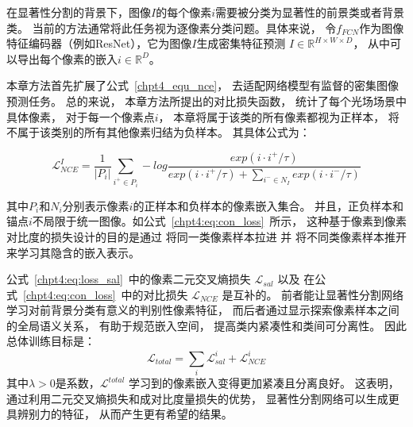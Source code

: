 % 

在显著性分割的背景下，图像$I$的每个像素$i$需要被分类为显著性的前景类或者背景类。
当前的方法通常将此任务视为逐像素分类问题。具体来说，
令$f_{FCN}$作为图像特征编码器（例如ResNet），它为图像$I$生成密集特征预测
$I\in \mathbb{R}^{ H \times W \times D}$，
从中可以导出每个像素的嵌入$i \in  \mathbb{R}^{D}$。



本章方法首先扩展了公式~\ref{chpt4_equ_nce}，
去适配网络模型有监督的密集图像预测任务。
总的来说，
本章方法所提出的对比损失函数，
统计了每个光场场景中具体像素，
对于每一个像素点$i$，
本章将属于该类的所有像素都视为正样本，
将不属于该类别的所有其他像素归结为负样本。
其具体公式为：



\begin{equation}
	\mathcal{L} _{NCE}^{I}= 
	\frac{1}{|P_{i}|}
	\sum_{i^{+}\in P_{i}}^{}  
	-log \frac
	{exp(i \cdot i^{+ }/\tau )}
	{exp(i \cdot i^{+}/\tau )+ \sum_{i^{-}\in N_{I}} exp(i \cdot i^{-}/\tau )} 
	\label{chpt4:eq:con_loss}
\end{equation}



其中$P_{i}$和$N_{i}$分别表示像素$i$的正样本和负样本的像素嵌入集合。
并且，正负样本和锚点$i$不局限于统一图像。如公式~\ref{chpt4:eq:con_loss}~所示，
这种基于像素到像素对比度的损失设计的目的是通过
将同一类像素样本拉进
并
将不同类像素样本推开来学习其隐含的嵌入表示。





% 
% 
公式~\ref{chpt4:eq:loss_sal}~中的像素二元交叉熵损失
$\mathcal{L}_{sal} $
以及
在公式~\ref{chpt4:eq:con_loss}~中的对比损失
$\mathcal{L}_{NCE} $
是互补的。
前者能让显著性分割网络学习对前背景分类有意义的判别性像素特征，
而后者通过显示探索像素样本之间的全局语义关系，
有助于规范嵌入空间，
提高类内紧凑性和类间可分离性。
因此总体训练目标是：
\begin{equation}
	\mathcal{L}_{total} = \sum_{i}^{} \mathcal{L}_{sal}^{i} + \mathcal{L}_{NCE}^{i}
\end{equation}
% 
% 
% 
% 
其中$\lambda > 0 $是系数，$\mathcal{L}^{total}$
学习到的像素嵌入变得更加紧凑且分离良好。
这表明，通过利用二元交叉熵损失和成对比度量损失的优势，
显著性分割网络可以生成更具辨别力的特征，
从而产生更有希望的结果。









